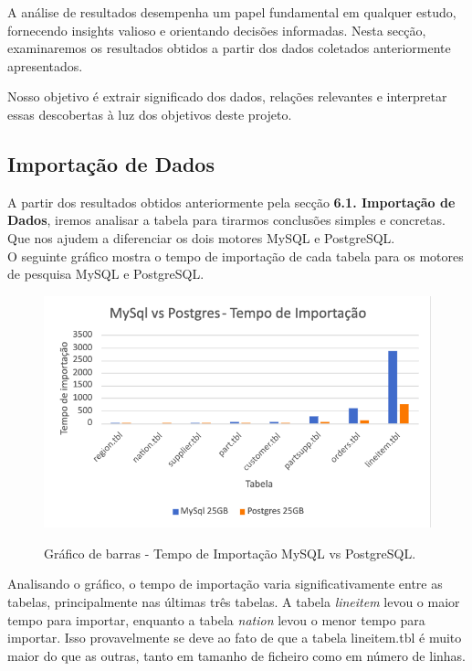 \documentclass{article}
\begin{document}
\texttt{}\par A análise de resultados desempenha um papel fundamental em qualquer estudo, fornecendo insights valioso e orientando decisões informadas. Nesta secção, examinaremos os resultados obtidos a partir dos dados coletados anteriormente apresentados. 

\texttt{}\par Nosso objetivo é extrair significado dos dados, relações relevantes e interpretar essas descobertas à luz dos objetivos deste projeto.\\
\subsection{Importação de Dados}
\texttt{}\par A partir dos resultados obtidos anteriormente pela secção \textbf{6.1. Importação de Dados}, iremos analisar a tabela para tirarmos conclusões simples e concretas. Que nos ajudem a diferenciar os dois motores MySQL e PostgreSQL.\\
O seguinte gráfico mostra o tempo de importação de cada tabela para os motores de pesquisa MySQL e PostgreSQL. 


\begin{figure}[H]
  \centering
  \includegraphics[width=\textwidth]{Graphs/ImportTime.png}\\
  \caption{Gráfico de barras - Tempo de Importação MySQL vs PostgreSQL.}
  \label{fig:row_import_time}
\end{figure}
Analisando o gráfico, o tempo de importação varia significativamente entre as tabelas, principalmente nas últimas três tabelas. A tabela \textit{lineitem} levou o maior tempo para importar, enquanto a tabela \textit{nation} levou o menor tempo para importar.
Isso provavelmente se deve ao fato de que a tabela lineitem.tbl é muito maior do que as outras, tanto em tamanho de ficheiro como em número de linhas.\\
\end{document}

